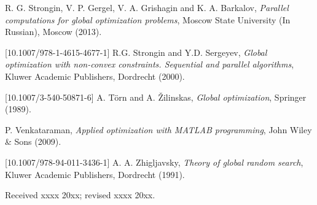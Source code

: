 \documentclass{aims}
\theoremstyle{definition}
\begin{document}
\begin{thebibliography}{10}
\newblock R. G. Strongin, V. P. Gergel, V. A. Grishagin and K. A. Barkalov,
\newblock \emph{Parallel computations for global optimization problems},
\newblock Moscow State University (In Russian), Moscow (2013).

[10.1007/978-1-4615-4677-1]
\newblock R.G. Strongin and Y.D. Sergeyev,
\newblock \emph{Global optimization with non-convex constraints. Sequential and parallel algorithms},
\newblock Kluwer Academic Publishers, Dordrecht (2000).

[10.1007/3-540-50871-6]
\newblock A. T\"orn and A. \v Zilinskas,
\newblock \emph{Global optimization},
\newblock Springer (1989).

\newblock P. Venkataraman,
\newblock \emph{Applied optimization with MATLAB programming},
\newblock John Wiley \& Sons (2009).

[10.1007/978-94-011-3436-1]
\newblock A. A. Zhigljavsky,
\newblock \emph{Theory of global random search},
\newblock Kluwer Academic Publishers, Dordrecht (1991).

\end{thebibliography}

\medskip
Received xxxx 20xx; revised xxxx 20xx.
\medskip
\end{document}

